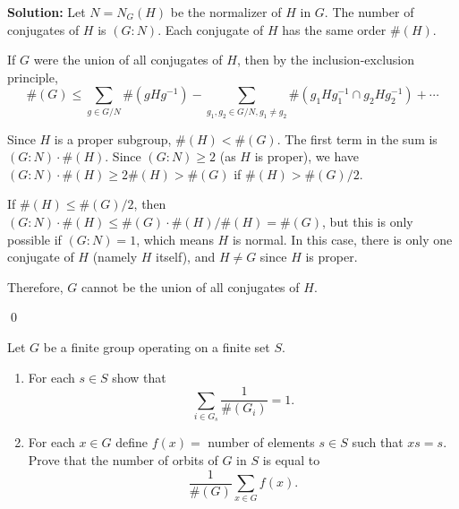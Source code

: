 \noindent\textbf{Solution:} Let $N = N_G(H)$ be the normalizer of $H$ in $G$. The number of conjugates of $H$ is $(G : N)$. Each conjugate of $H$ has the same order $\#(H)$.

If $G$ were the union of all conjugates of $H$, then by the inclusion-exclusion principle,
\[\#(G) \leq \sum_{g \in G/N} \#(gHg^{-1}) - \sum_{g_1, g_2 \in G/N, g_1 \neq g_2} \#(g_1Hg_1^{-1} \cap g_2Hg_2^{-1}) + \cdots\]

Since $H$ is a proper subgroup, $\#(H) < \#(G)$. The first term in the sum is $(G : N) \cdot \#(H)$. Since $(G : N) \geq 2$ (as $H$ is proper), we have $(G : N) \cdot \#(H) \geq 2\#(H) > \#(G)$ if $\#(H) > \#(G)/2$.

If $\#(H) \leq \#(G)/2$, then $(G : N) \cdot \#(H) \leq \#(G) \cdot \#(H)/\#(H) = \#(G)$, but this is only possible if $(G : N) = 1$, which means $H$ is normal. In this case, there is only one conjugate of $H$ (namely $H$ itself), and $H \neq G$ since $H$ is proper.

Therefore, $G$ cannot be the union of all conjugates of $H$.


\qed
\begin{problembox}
Let $G$ be a finite group operating on a finite set $S$.
\begin{enumerate}[label=(\alph*)]
\item For each $s \in S$ show that 
\[\sum_{i \in G_s} \frac{1}{\#(G_i)} = 1.\]
\item For each $x \in G$ define $f(x) = $ number of elements $s \in S$ such that $xs = s$. Prove that the number of orbits of $G$ in $S$ is equal to 
\[\frac{1}{\#(G)} \sum_{x \in G} f(x).\]
\end{enumerate}
\end{problembox}

